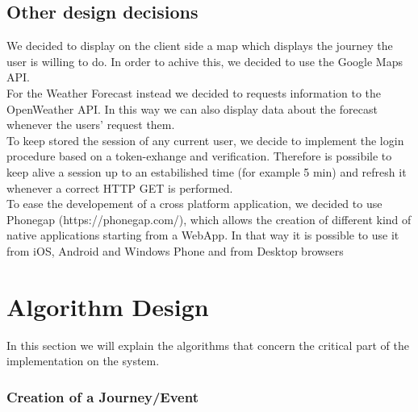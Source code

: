 \documentclass[numbers=noenddot, 12pt, a4paper, oneside]{scrbook}
\begin{document}
\section{Other design decisions}

We decided to display on the client side a map which displays the journey the user is willing to do. In order to achive this, we decided to use the Google Maps API.\\

For the Weather Forecast instead we decided to requests information to the OpenWeather API. In this way we can also display data about the forecast whenever the users' request them.\\

To keep stored the session of any current user, we decide to implement the login procedure based on a token-exhange and verification. Therefore is possibile to keep alive a session up to an estabilished time (for example 5 min) and refresh it whenever a correct HTTP GET is performed.\\

To ease the developement of a cross platform application, we decided to use Phonegap (https://phonegap.com/), which allows the creation of different kind of native applications starting from a WebApp. In that way it is possible to use it from iOS, Android and Windows Phone and from Desktop browsers


\chapter{Algorithm Design}

In this section we will explain the algorithms that concern the critical part of the implementation on the system.

\subsection*{Creation of a Journey/Event}
\end{document}
